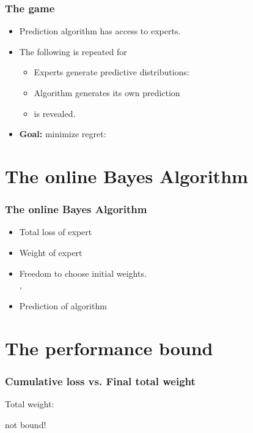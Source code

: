 \documentclass[handout]{beamer}
\begin{document}
\begin{frame}
\frametitle{The game}
\begin{itemize}
\item Prediction algorithm  has access to  experts.
\item The following is repeated for 
\begin{itemize}
\item Experts generate predictive distributions: 
\item Algorithm generates its own prediction 
\item {} is revealed.
\end{itemize}
\item {\bf Goal:} minimize regret:
\R{\[
-\sum_{t=1}^T \log p_A^t(c^t) + \min_{i=1,\dots,N} \paren{-\sum_{t=1}^T \log p_i^t(c^t)} 
\]}
\end{itemize}
\end{frame}

\section{The online Bayes Algorithm}

\begin{frame}
\frametitle{The online Bayes Algorithm}
\begin{itemize}
\item {\color{blue} Total loss} of expert 
\item {\color{blue}Weight} of expert 
\item
Freedom to choose initial weights.\\
 , 
\item {\color{blue}Prediction} of algorithm 
\R{\[
\vp_A^t = \frac{\sum_{i=1}^N \wt{t}{i} \vp_i^t}{\sum_{i=1}^N \wt{t}{i}}
\]}
\end{itemize}
\end{frame}

\section{The performance bound}

\begin{frame}
\frametitle{Cumulative loss vs. Final total weight}

 Total weight: 

 
 
\R{\[
\onslide<8-> -\log W^{T+1} =
\onslide<6-> -\log \frac{W^{T+1}}{W^1} = -\sum_{t=1}^T \log p_A^t(c^t)
\onslide<7-> = L_A^T
\]}
  not bound!
\end{frame}
\end{document}
